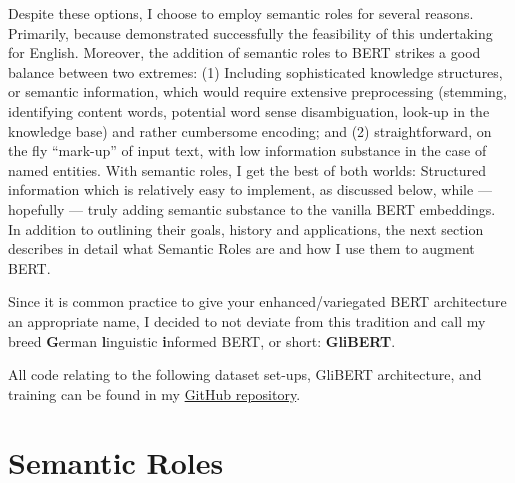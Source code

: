 Despite these options, I choose to employ semantic roles for several reasons. Primarily,
because \citeauthor{zhang2019semantics} demonstrated successfully the feasibility of
this undertaking for English. Moreover, the addition of semantic roles to BERT strikes a
good balance between two extremes: (1) Including sophisticated knowledge structures, or
semantic information, which would require extensive preprocessing (stemming, identifying
content words, potential word sense disambiguation, look-up in the knowledge base) and
rather cumbersome encoding; and (2) straightforward, on the fly ``mark-up'' of input text,
with low information substance in the case of named entities. With semantic roles, I get
the best of both worlds: Structured information which is relatively easy to implement, as
discussed below, while --- hopefully --- truly adding semantic substance to the vanilla
BERT embeddings. In addition to outlining their goals, history and applications, the next
section describes in detail what Semantic Roles are and how I use them to augment BERT.

Since it is common practice to give your enhanced/variegated BERT architecture an appropriate
name, I decided to not deviate from this tradition and call my breed \textbf{G}erman
\textbf{l}inguistic \textbf{i}nformed BERT, or short: \textbf{GliBERT}.

All code relating to the following dataset set-ups, GliBERT architecture, and training
can be found in my \href{https://github.com/JonathanSchaber/Masterarbeit}{GitHub
repository}.


\section{Semantic Roles}
\label{sec:semantic-roles}



